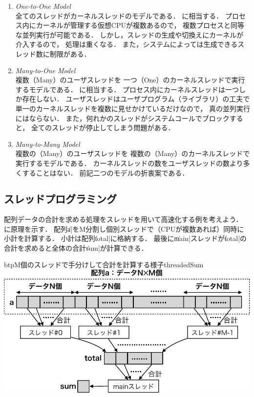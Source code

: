 \begin{enumerate}
\item \emph{One-to-One Model} \\
  全てのスレッドがカーネルスレッドのモデルである．
  に相当する．
  プロセス内にカーネルが管理する仮想CPUが複数あるので，
  複数プロセスと同等な並列実行が可能である．
  しかし，スレッドの生成や切換えにカーネルが介入するので，
  処理は重くなる．
  また，システムによっては生成できるスレッド数に制限がある．
\item \emph{Many-to-One Model} \\
  複数（Many）のユーザスレッドを
  一つ（One）のカーネルスレッドで実行するモデルである．
  に相当する．
  プロセス内にカーネルスレッドは一つしか存在しない．
  ユーザスレッドはユーザプログラム（ライブラリ）の工夫で
  単一のカーネルスレッドを複数に見せかけているだけなので，
  真の並列実行にはならない．
  また，何れかのスレッドがシステムコールでブロックすると，
  全てのスレッドが停止してしまう問題がある．
\item \emph{Many-to-Many Model} \\
  複数の（Many）のユーザスレッドを
  複数の（Many）のカーネルスレッドで実行するモデルである．
  カーネルスレッドの数をユーザスレッドの数より多くすることはない．
  前記二つのモデルの折衷案である．
\end{enumerate}

\subsection{スレッドプログラミング}
配列データの合計を求める処理をスレッドを用いて高速化する例を考えよう．
に原理を示す．
配列\|a|をM分割し個別スレッドで（CPUが複数あれば）同時に小計を計算する．
小計は配列\|total|に格納する．
最後に\|main|スレッドが\|total|の合計を求めると全体の合計\|sum|が計算できる．

\begin{myfig}{btp}{M個のスレッドで手分けして合計を計算する様子}{threadedSum}
  \includegraphics[scale=0.66]{Fig/threadedSum-crop.pdf}
\end{myfig}

